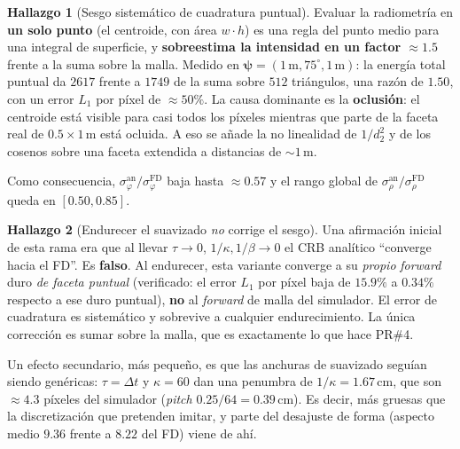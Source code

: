 \documentclass[11pt,a4paper]{article}
\newcommand{\vect}[1]{\boldsymbol{#1}}
\theoremstyle{definition}
\newtheorem{finding}{Hallazgo}
\begin{document}
\begin{finding}[Sesgo sistemático de cuadratura puntual]
\label{find:cuadratura}
Evaluar la radiometría en \textbf{un solo punto} (el centroide, con área
$w\cdot h$) es una regla del punto medio para una integral de superficie, y
\textbf{sobreestima la intensidad en un factor $\approx1.5$} frente a la suma
sobre la malla. Medido en $\vect\psi=(1\,\text{m},75^\circ,1\,\text{m})$: la
energía total puntual da $2617$ frente a $1749$ de la suma sobre $512$
triángulos, una razón de $1.50$, con un error $L_1$ por píxel de $\approx50\%$.
La causa dominante es la \textbf{oclusión}: el centroide está visible para casi
todos los píxeles mientras que parte de la faceta real de $0.5\times1\,$m está
ocluida. A eso se añade la no linealidad de $1/d_2^2$ y de los cosenos sobre
una faceta extendida a distancias de $\sim1\,$m.
\end{finding}

Como consecuencia, $\sigma_\varphi^{\text{an}}/\sigma_\varphi^{\text{FD}}$ baja
hasta $\approx0.57$ y el rango global de
$\sigma_\rho^{\text{an}}/\sigma_\rho^{\text{FD}}$ queda en $[0.50,0.85]$.

\begin{finding}[Endurecer el suavizado \emph{no} corrige el sesgo]
\label{find:no-converge}
Una afirmación inicial de esta rama era que al llevar $\tau\to0$,
$1/\kappa,1/\beta\to0$ el CRB analítico \enquote{converge hacia el FD}. Es
\textbf{falso}. Al endurecer, esta variante converge a su \emph{propio}
\emph{forward} duro \emph{de faceta puntual} (verificado: el error $L_1$ por
píxel baja de $15.9\%$ a $0.34\%$ respecto a ese duro puntual), \textbf{no} al
\emph{forward} de malla del simulador. El error de cuadratura es sistemático y
sobrevive a cualquier endurecimiento. La única corrección es sumar sobre la
malla, que es exactamente lo que hace PR\#4.
\end{finding}

Un efecto secundario, más pequeño, es que las anchuras de suavizado seguían
siendo genéricas: $\tau=\Delta t$ y $\kappa=60$ dan una penumbra de $1/\kappa =
1.67\,$cm, que son $\approx4.3$ píxeles del simulador (\emph{pitch}
$0.25/64=0.39\,$cm). Es decir, más gruesas que la discretización que pretenden
imitar, y parte del desajuste de forma (aspecto medio $9.36$ frente a $8.22$
del FD) viene de ahí.
\end{document}
